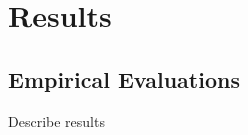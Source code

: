 \chapter{Results}

\section{Empirical Evaluations}

\begin{shaded}
  Describe results
  \end{shaded}
